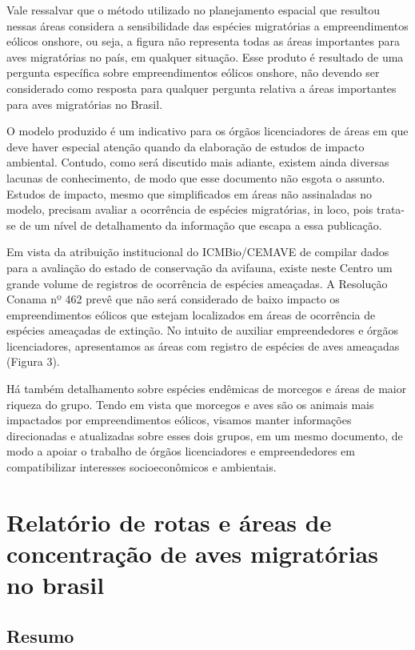 \documentclass[
]{scrbook}
\begin{document}
Vale ressalvar que o método utilizado no planejamento espacial que resultou nessas áreas considera a sensibilidade das espécies migratórias a empreendimentos eólicos onshore, ou seja, a figura não representa todas as áreas importantes para aves migratórias no país, em qualquer situação. Esse produto é resultado de uma pergunta específica sobre empreendimentos eólicos onshore, não devendo ser considerado como resposta para qualquer pergunta relativa a áreas importantes para aves migratórias no Brasil.

O modelo produzido é um indicativo para os órgãos licenciadores de áreas em que deve haver especial atenção quando da elaboração de estudos de impacto ambiental. Contudo, como será discutido mais adiante, existem ainda diversas lacunas de conhecimento, de modo que esse documento não esgota o assunto. Estudos de impacto, mesmo que simplificados em áreas não assinaladas no modelo, precisam avaliar a ocorrência de espécies migratórias, in loco, pois trata-se de um nível de detalhamento da informação que escapa a essa publicação.

Em vista da atribuição institucional do ICMBio/CEMAVE de compilar dados para a avaliação do estado de conservação da avifauna, existe neste Centro um grande volume de registros de ocorrência de espécies ameaçadas. A Resolução Conama nº 462 prevê que não será considerado de baixo impacto os empreendimentos eólicos que estejam localizados em áreas de ocorrência de espécies ameaçadas de extinção. No intuito de auxiliar empreendedores e órgãos licenciadores, apresentamos as áreas com registro de espécies de aves ameaçadas (Figura 3).

Há também detalhamento sobre espécies endêmicas de morcegos e áreas de maior riqueza do grupo. Tendo em vista que morcegos e aves são os animais mais impactados por empreendimentos eólicos, visamos manter informações direcionadas e atualizadas sobre esses dois grupos, em um mesmo documento, de modo a apoiar o trabalho de órgãos licenciadores e empreendedores em compatibilizar interesses socioeconômicos e ambientais.

\hypertarget{aves}{%
\chapter{Relatório de rotas e áreas de concentração de aves migratórias no brasil}\label{aves}}

\hypertarget{resumo}{%
\section*{Resumo}\label{resumo}}
\end{document}
